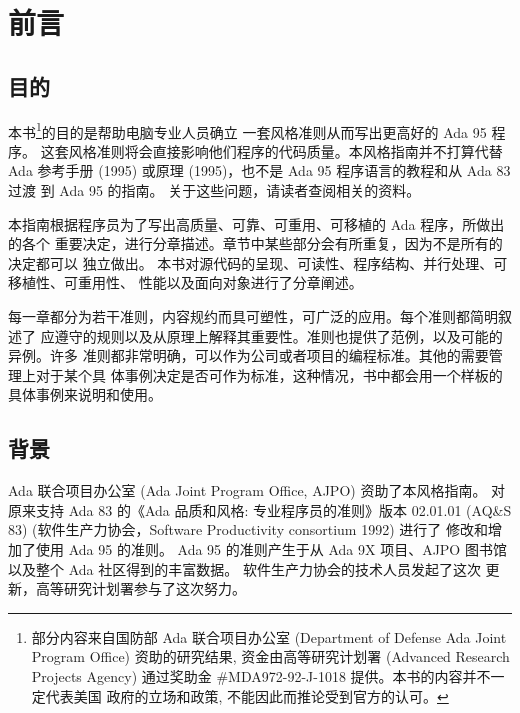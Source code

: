 %
%
%

\chapter{前言}
\pagestyle{empty}

\section{目的}
本书\footnote{部分内容来自国防部 Ada 联合项目办公室 (Department of Defense Ada
Joint Program Office) 资助的研究结果, 资金由高等研究计划署 (Advanced Research
Projects Agency) 通过奖助金 \#MDA972-92-J-1018 提供。本书的内容并不一定代表美国
政府的立场和政策, 不能因此而推论受到官方的认可。}的目的是帮助电脑专业人员确立
一套风格准则从而写出更高好的 Ada 95 程序。
这套风格准则将会直接影响他们程序的代码质量。本风格指南并不打算代替 Ada
参考手册 (1995) 或原理 (1995)，也不是 Ada 95 程序语言的教程和从 Ada 83 过渡
到 Ada 95 的指南。 关于这些问题，请读者查阅相关的资料。

本指南根据程序员为了写出高质量、可靠、可重用、可移植的 Ada 程序，所做出的各个
重要决定，进行分章描述。章节中某些部分会有所重复，因为不是所有的决定都可以
独立做出。 本书对源代码的呈现、可读性、程序结构、并行处理、可移植性、可重用性、
性能以及面向对象进行了分章阐述。

每一章都分为若干准则，内容规约而具可塑性，可广泛的应用。每个准则都简明叙述了
应遵守的规则以及从原理上解释其重要性。准则也提供了范例，以及可能的异例。许多
准则都非常明确，可以作为公司或者项目的编程标准。其他的需要管理上对于某个具
体事例决定是否可作为标准，这种情况，书中都会用一个样板的具体事例来说明和使用。

\section{背景}
Ada 联合项目办公室 (Ada Joint Program Office, AJPO) 资助了本风格指南。
对原来支持 Ada 83 的《Ada 品质和风格: 专业程序员的准则》版本 02.01.01
 (AQ\&S 83) (软件生产力协会，Software Productivity consortium 1992) 进行了
修改和增加了使用 Ada 95 的准则。 Ada 95 的准则产生于从 Ada 9X 项目、AJPO
图书馆以及整个 Ada 社区得到的丰富数据。 软件生产力协会的技术人员发起了这次
更新，高等研究计划署参与了这次努力。

